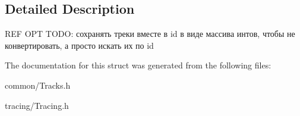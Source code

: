 \subsection{Detailed Description}
R\+EF O\+PT T\+O\+DO\+: сохранять треки вместе в id в виде массива интов, чтобы не конвертировать, а просто искать их по id 

The documentation for this struct was generated from the following files\+:\begin{DoxyCompactItemize}
\item 
common/Tracks.\+h\item 
tracing/Tracing.\+h\end{DoxyCompactItemize}
